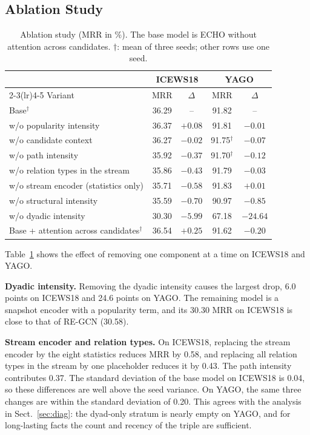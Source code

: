 \documentclass[runningheads]{llncs}
\newcommand{\model}{ECHO}
\newcommand{\para}[1]{\smallskip\noindent\textbf{#1}}
\begin{document}
\subsection{Ablation Study}
\label{sec:ablation}

\begin{table}[t]
  \centering
  \caption{Ablation study (MRR in \%). The base model is \model{} without attention across candidates. $\dagger$: mean of three seeds; other rows use one seed.}
  \label{tab:ablation}
  \setlength{\tabcolsep}{6pt}
  \small
  \begin{tabular}{l cc cc}
    \toprule
    & \multicolumn{2}{c}{ICEWS18} & \multicolumn{2}{c}{YAGO} \\
    \cmidrule(lr){2-3}\cmidrule(lr){4-5}
    Variant & MRR & $\Delta$ & MRR & $\Delta$ \\
    \midrule
    Base$^\dagger$                      & 36.29 & --      & 91.82 & -- \\
    w/o popularity intensity            & 36.37 & $+0.08$ & 91.81 & $-0.01$ \\
    w/o candidate context               & 36.27 & $-0.02$ & 91.75$^\dagger$ & $-0.07$ \\
    w/o path intensity                  & 35.92 & $-0.37$ & 91.70$^\dagger$ & $-0.12$ \\
    w/o relation types in the stream    & 35.86 & $-0.43$ & 91.79 & $-0.03$ \\
    w/o stream encoder (statistics only)& 35.71 & $-0.58$ & 91.83 & $+0.01$ \\
    w/o structural intensity            & 35.59 & $-0.70$ & 90.97 & $-0.85$ \\
    w/o dyadic intensity                & 30.30 & $-5.99$ & 67.18 & $-24.64$ \\
    \midrule
    Base + attention across candidates$^\dagger$ & 36.54 & $+0.25$ & 91.62 & $-0.20$ \\
    \bottomrule
  \end{tabular}
\end{table}

Table~\ref{tab:ablation} shows the effect of removing one component at a time on ICEWS18 and YAGO.

\para{Dyadic intensity.} Removing the dyadic intensity causes the largest drop, 6.0 points on ICEWS18 and 24.6 points on YAGO. The remaining model is a snapshot encoder with a popularity term, and its 30.30 MRR on ICEWS18 is close to that of RE-GCN (30.58).

\para{Stream encoder and relation types.} On ICEWS18, replacing the stream encoder by the eight statistics reduces MRR by 0.58, and replacing all relation types in the stream by one placeholder reduces it by 0.43. The path intensity contributes 0.37. The standard deviation of the base model on ICEWS18 is 0.04, so these differences are well above the seed variance. On YAGO, the same three changes are within the standard deviation of 0.20. This agrees with the analysis in Sect.~\ref{sec:diag}: the dyad-only stratum is nearly empty on YAGO, and for long-lasting facts the count and recency of the triple are sufficient.
\end{document}
